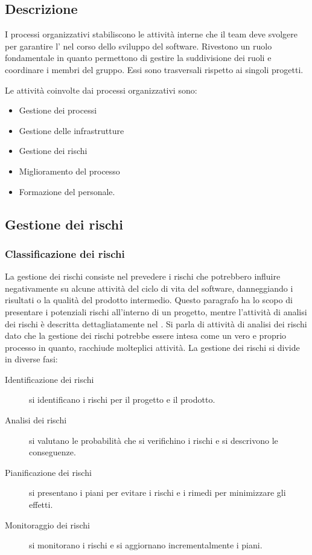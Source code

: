 \documentclass[../norme-di-progetto.tex]{subfiles}
\begin{document}
\subsection{Descrizione}%
\label{sub:processi_organizzativi/descrizione}

I processi organizzativi stabiliscono le attività interne che il team deve svolgere per garantire l' nel corso dello sviluppo del software.
Rivestono un ruolo fondamentale in quanto permettono di gestire la suddivisione dei ruoli e coordinare i membri del gruppo.
Essi sono trasversali rispetto ai singoli progetti.

Le attività coinvolte dai processi organizzativi sono:

\begin{itemize}
  \item Gestione dei processi
  \item Gestione delle infrastrutture
  \item Gestione dei rischi
  \item Miglioramento del processo
  \item Formazione del personale.
\end{itemize}

\subsection{Gestione dei rischi}%
\label{sub:gestione_dei_rischi}

\subsubsection{Classificazione dei rischi}%
\label{subs:classificazione_dei_rischi}
La gestione dei rischi consiste nel prevedere i rischi che potrebbero influire negativamente su alcune attività del ciclo di vita del software, danneggiando i risultati o la qualità del prodotto intermedio.
Questo paragrafo ha lo scopo di presentare i potenziali rischi all'interno di un progetto, mentre l'attività di analisi dei rischi è descritta dettagliatamente nel .
Si parla di attività di analisi dei rischi dato che la gestione dei rischi potrebbe essere intesa come un vero e proprio processo in quanto, racchiude molteplici attività. La gestione dei rischi si divide in diverse fasi:

\begin{description}
  \item [Identificazione dei rischi] si identificano i rischi per il progetto e il prodotto.
  \item [Analisi dei rischi] si valutano le probabilità che si verifichino i rischi e si descrivono le conseguenze.
  \item [Pianificazione dei rischi] si presentano i piani per evitare i rischi e i rimedi per minimizzare gli effetti.
  \item [Monitoraggio dei rischi] si monitorano i rischi e si aggiornano incrementalmente i piani.
\end{description}
\end{document}
